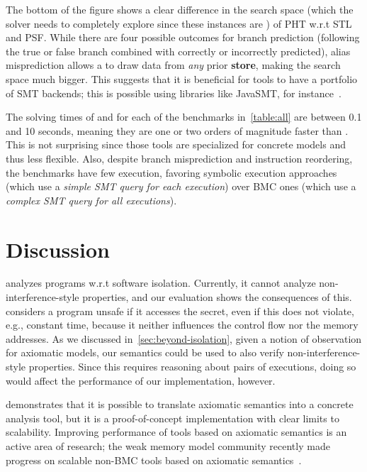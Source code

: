 \documentclass[conference]{IEEEtran}
\begin{document}
The bottom of the figure shows a clear difference in the search space (which the solver needs to completely explore since these instances are \unsat) of PHT w.r.t STL and PSF.
While there are four possible outcomes for branch prediction (following the true or false branch combined with correctly or incorrectly predicted), alias misprediction allows a \load to draw data from \emph{any} prior {\bf store}, making the search space much bigger.
This suggests that it is beneficial for tools to have a portfolio of SMT backends; this is possible using libraries like JavaSMT, for instance~\cite{BaierBF20,KarpenkovF016}.



The solving times of \spectector and \binsec for each of the benchmarks in~\autoref{table:all} are between 0.1 and 10 seconds, meaning they are one or two orders of magnitude faster than \zombmc.
This is not surprising since those tools are specialized for concrete models and thus less flexible. 
Also, despite branch misprediction and instruction reordering, the benchmarks have few execution, favoring symbolic execution approaches (which use a \emph{simple SMT query for each execution}) over BMC ones (which use a \emph{complex SMT query for all executions}).

\section{Discussion}
\label{sec:discussion}

\zombmc analyzes programs w.r.t software isolation.
Currently, it cannot analyze non-interference-style properties, and
our evaluation shows the consequences of this.
\zombmc considers a program unsafe if it accesses the secret, even if this does not violate, e.g., constant time, because it neither influences the control flow nor the memory addresses. 
As we discussed in~\autoref{sec:beyond-isolation}, given a notion of observation for axiomatic models, our semantics could be used to also verify non-interference-style properties.
Since this requires reasoning about pairs of executions, doing so would affect the performance of our implementation, however.

\zombmc demonstrates that it is possible to translate axiomatic semantics into a concrete analysis tool, but it is a proof-of-concept implementation with clear limits to scalability.
Improving performance of tools based on axiomatic semantics is an active area of research; the weak memory model community recently made progress on scalable non-BMC tools based on axiomatic semantics~\cite{Kokologiannakis21}.
\end{document}

